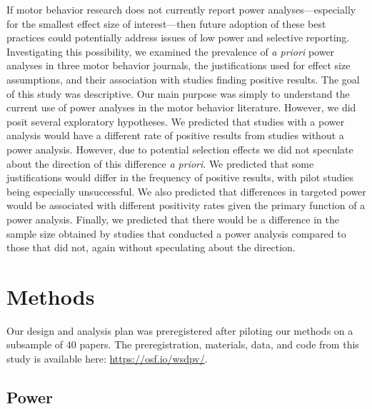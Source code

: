 \documentclass[
  man, donotrepeattitle,mask,floatsintext]{apa7}
\begin{document}
If motor behavior research does not currently report power analyses---especially for the smallest effect size of interest---then future adoption of these best practices could potentially address issues of low power and selective reporting. Investigating this possibility, we examined the prevalence of \emph{a priori} power analyses in three motor behavior journals, the justifications used for effect size assumptions, and their association with studies finding positive results. The goal of this study was descriptive. Our main purpose was simply to understand the current use of power analyses in the motor behavior literature. However, we did posit several exploratory hypotheses. We predicted that studies with a power analysis would have a different rate of positive results from studies without a power analysis. However, due to potential selection effects we did not speculate about the direction of this difference \emph{a priori}. We predicted that some justifications would differ in the frequency of positive results, with pilot studies being especially unsuccessful. We also predicted that differences in targeted power would be associated with different positivity rates given the primary function of a power analysis. Finally, we predicted that there would be a difference in the sample size obtained by studies that conducted a power analysis compared to those that did not, again without speculating about the direction.

\hypertarget{methods}{%
\section{Methods}\label{methods}}

Our design and analysis plan was preregistered after piloting our methods on a subsample of 40 papers. The preregistration, materials, data, and code from this study is available here: \url{https://osf.io/wsdpv/}.

\hypertarget{power}{%
\subsection{Power}\label{power}}
\end{document}
